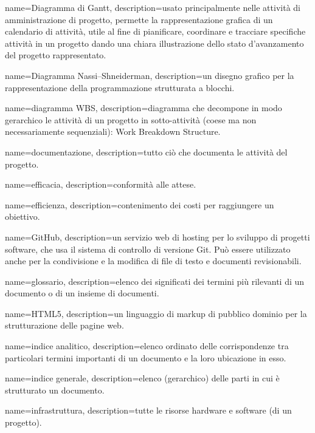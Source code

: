 {
name={Diagramma di Gantt},
description={usato principalmente nelle attività di amministrazione di progetto, permette la rappresentazione graﬁca di un calendario di attività, utile al ﬁne di pianiﬁcare, coordinare e tracciare speciﬁche attività in un progetto dando una chiara illustrazione dello stato d’avanzamento del progetto rappresentato.}
}

{
name={Diagramma Nassi–Shneiderman},
description={un disegno grafico per la rappresentazione della programmazione strutturata a blocchi. }
}

{
name={diagramma WBS},
description={diagramma che decompone in modo gerarchico le attività di un progetto in sotto-attività (coese ma non necessariamente sequenziali): Work Breakdown Structure.}
}

{
name={documentazione},
description={tutto ciò che documenta le attività del progetto.}
}

{
name={efficacia},
description={conformità alle attese.}
}

{
name={efficienza},
description={contenimento dei costi per raggiungere un obiettivo.}
}

{
name={GitHub},
description={un servizio web di hosting per lo sviluppo di progetti software, che usa il sistema di controllo di versione Git. Può essere utilizzato anche per la condivisione e la modiﬁca di ﬁle di testo e documenti revisionabili.}
}

{
name={glossario},
description={elenco dei significati dei termini più rilevanti di un documento o di un insieme di documenti.}
}

{
name={HTML5},
description={un linguaggio di markup di pubblico dominio per la strutturazione delle pagine web.}
}

{
name={indice analitico},
description={elenco ordinato delle corrispondenze tra particolari termini importanti di un documento e la loro ubicazione in esso.}
}

{
name={indice generale},
description={elenco (gerarchico) delle parti in cui è strutturato un documento.}
}

{
name={infrastruttura},
description={tutte le risorse hardware e software (di un progetto).}
}

